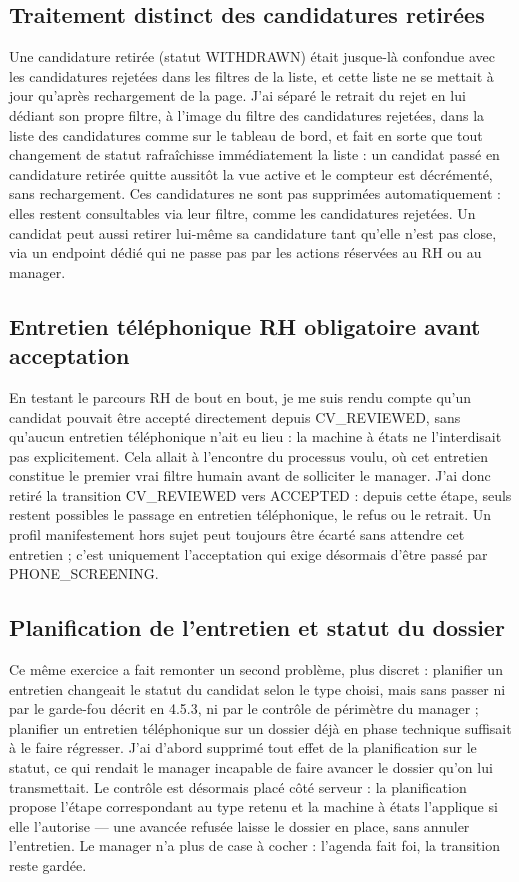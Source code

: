 \subsection{Traitement distinct des candidatures retirées}
\label{sec_4_5_7}
Une candidature retirée (statut WITHDRAWN) était jusque-là confondue avec les candidatures rejetées dans les filtres de la liste, et cette liste ne se mettait à jour qu’après rechargement de la page. J’ai séparé le retrait du rejet en lui dédiant son propre filtre, à l’image du filtre des candidatures rejetées, dans la liste des candidatures comme sur le tableau de bord, et fait en sorte que tout changement de statut rafraîchisse immédiatement la liste : un candidat passé en candidature retirée quitte aussitôt la vue active et le compteur est décrémenté, sans rechargement. Ces candidatures ne sont pas supprimées automatiquement : elles restent consultables via leur filtre, comme les candidatures rejetées. Un candidat peut aussi retirer lui-même sa candidature tant qu’elle n’est pas close, via un endpoint dédié qui ne passe pas par les actions réservées au RH ou au manager.

\subsection{Entretien téléphonique RH obligatoire avant acceptation}
\label{sec_4_5_8}
En testant le parcours RH de bout en bout, je me suis rendu compte qu’un candidat pouvait être accepté directement depuis CV\_REVIEWED, sans qu’aucun entretien téléphonique n’ait eu lieu : la machine à états ne l’interdisait pas explicitement. Cela allait à l’encontre du processus voulu, où cet entretien constitue le premier vrai filtre humain avant de solliciter le manager. J’ai donc retiré la transition CV\_REVIEWED vers ACCEPTED : depuis cette étape, seuls restent possibles le passage en entretien téléphonique, le refus ou le retrait. Un profil manifestement hors sujet peut toujours être écarté sans attendre cet entretien ; c’est uniquement l’acceptation qui exige désormais d’être passé par PHONE\_SCREENING.

\subsection{Planification de l’entretien et statut du dossier}
\label{sec_4_5_9}
Ce même exercice a fait remonter un second problème, plus discret : planifier un entretien changeait le statut du candidat selon le type choisi, mais sans passer ni par le garde-fou décrit en 4.5.3, ni par le contrôle de périmètre du manager ; planifier un entretien téléphonique sur un dossier déjà en phase technique suffisait à le faire régresser. J’ai d’abord supprimé tout effet de la planification sur le statut, ce qui rendait le manager incapable de faire avancer le dossier qu’on lui transmettait. Le contrôle est désormais placé côté serveur : la planification propose l’étape correspondant au type retenu et la machine à états l’applique si elle l’autorise — une avancée refusée laisse le dossier en place, sans annuler l’entretien. Le manager n’a plus de case à cocher : l’agenda fait foi, la transition reste gardée.

